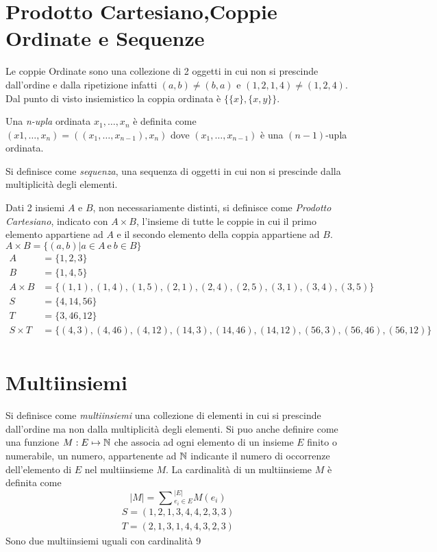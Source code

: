 \section{Prodotto Cartesiano,Coppie Ordinate e Sequenze}
Le coppie Ordinate sono una collezione di 2 oggetti in cui non si prescinde
dall'ordine e dalla ripetizione infatti $(a,b) \neq (b,a)$ e $(1,2,1,4) \neq (1,2,4)$.
Dal punto di visto insiemistico la coppia ordinata è $\{\{x\},\{x,y\}\}$.

Una \emph{n-upla} ordinata $x_1,\dots,x_n$ è definita come $(x1,\dots,x_n) = ( (x_1,\dots,x_{n-1}),x_n)$
dove $(x_1,\dots,x_{n-1})$ è una $(n-1)$-upla ordinata.

Si definisce come \emph{sequenza}, una sequenza di oggetti in cui non si prescinde
dalla multiplicità degli elementi.

Dati 2 insiemi $A$ e $B$, non necessariamente  distinti, si definisce come \textit{Prodotto Cartesiano},
indicato con $A \times B$, l'insieme di tutte le coppie in cui il primo elemento appartiene ad $A$
e il secondo elemento della coppia appartiene ad $B$.\newline
$A \times B = \{(a,b) | a \in A \ \text{e} \ b \in B\} $
\begin{align*}
A & = \{1,2,3\} \\
B & = \{1,4,5\} \\
A \times B & = \{(1,1),(1,4),(1,5),(2,1),(2,4),(2,5),(3,1),(3,4),(3,5)\} \\
S & = \{ 4,14,56 \} \\
T & = \{ 3,46,12 \} \\
S \times T & = \{(4,3),(4,46),(4,12),(14,3),(14,46),(14,12),(56,3),(56,46),(56,12) \} \\
\end{align*}

\section{Multiinsiemi}
Si definisce come \emph{multiinsiemi} una collezione di elementi in cui si prescinde
dall'ordine ma non dalla multiplicità degli elementi.\newline
Si puo anche definire come una funzione $M:E \mapsto \mathbb{N}$ che associa ad ogni elemento
di un insieme $E$ finito o numerabile, un numero, appartenente ad $\mathbb{N}$ indicante
il numero di occorrenze dell'elemento di $E$ nel multiinsieme $M$.\newline
La cardinalità di un multiinsieme $M$ è definita come
\begin{equation*}
\displaystyle |M| = \sum{_{e_i \in E} ^ {|E|}} M(e_i)
\end{equation*}
\begin{align*}
S = (1,2,1,3,4,4,2,3,3) \\
T = (2,1,3,1,4,4,3,2,3)
\end{align*}
Sono due multiinsiemi uguali con cardinalità 9

